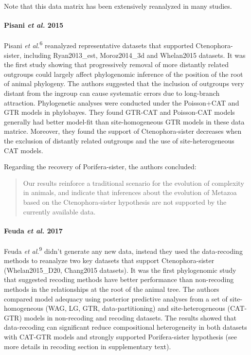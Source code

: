 \documentclass[]{article}
\let\oldparagraph\paragraph
\renewcommand{\paragraph}[1]{\oldparagraph{#1}\mbox{}}
\begin{document}
Note that this data matrix has been extensively reanalyzed in many
studies.

\hypertarget{pisani-et-al.-2015}{%
\paragraph{\texorpdfstring{Pisani \emph{et al.}
2015}{Pisani et al. 2015}}\label{pisani-et-al.-2015}}

Pisani \emph{et al.}\textsuperscript{6} reanalyzed representative
datasets that supported Ctenophora-sister, including Ryan2013\_est,
Moroz2014\_3d and Whelan2015 datasets. It was the first study showing
that progressively removal of more distantly related outgroups could
largely affect phylogenomic inference of the position of the root of
animal phylogeny. The authors suggested that the inclusion of outgroups
very distant from the ingroup can cause systematic errors due to
long-branch attraction. Phylogenetic analyses were conducted under the
Poisson+CAT and GTR models in phylobayes. They found GTR-CAT and
Poisson-CAT models generally had better model-fit than site-homogeneous
GTR models in these data matrice. Moreover, they found the support of
Ctenophora-sister decreases when the exclusion of distantly related
outgroups and the use of site-heterogeneous CAT models.

Regarding the recovery of Porifera-sister, the authors concluded:

\begin{quote}
Our results reinforce a traditional scenario for the evolution of
complexity in animals, and indicate that inferences about the evolution
of Metazoa based on the Ctenophora-sister hypothesis are not supported
by the currently available data.
\end{quote}

\hypertarget{feuda-et-al.-2017}{%
\paragraph{\texorpdfstring{Feuda \emph{et al.}
2017}{Feuda et al. 2017}}\label{feuda-et-al.-2017}}

Feuda \emph{et al.}\textsuperscript{9} didn't generate any new data,
instead they used the data-recoding methods to reanalyze two key
datasets that support Ctenophora-sister (Whelan2015\_D20, Chang2015
datasets). It was the first phylogenomic study that suggested recoding
methods have better performance than non-recoding methods in the
relationships at the root of the animal tree. The authors compared model
adequacy using posterior predictive analyses from a set of
site-homogeneous (WAG, LG, GTR, data-partitioning) and
site-heterogeneous (CAT-GTR) models in non-recoding and recoding
datasets. The results showed that data-recoding can significant reduce
compositional heterogeneity in both datasets with CAT-GTR models and
strongly supported Porifera-sister hypothesis (see more details in
recoding section in supplementary text).
\end{document}

